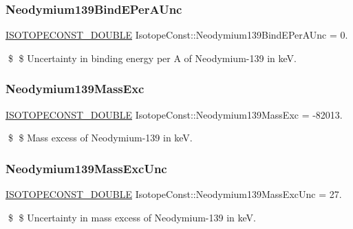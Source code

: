\subsubsection{\texorpdfstring{Neodymium139\+Bind\+E\+Per\+A\+Unc}{Neodymium139BindEPerAUnc}}
{\footnotesize\ttfamily \mbox{\hyperlink{group___isotope_const-_macros_ga8f45a7272ce02c0b4c65c44636ed719a}{I\+S\+O\+T\+O\+P\+E\+C\+O\+N\+S\+T\+\_\+\+D\+O\+U\+B\+LE}} Isotope\+Const\+::\+Neodymium139\+Bind\+E\+Per\+A\+Unc = 0.}

\$ \$ Uncertainty in binding energy per A of Neodymium-\/139 in keV. \mbox{\label{group___isotope_const-_neodymium-_nd139_gac33d0d9065e27fe2f9649759d564e57c}} 
\subsubsection{\texorpdfstring{Neodymium139\+Mass\+Exc}{Neodymium139MassExc}}
{\footnotesize\ttfamily \mbox{\hyperlink{group___isotope_const-_macros_ga8f45a7272ce02c0b4c65c44636ed719a}{I\+S\+O\+T\+O\+P\+E\+C\+O\+N\+S\+T\+\_\+\+D\+O\+U\+B\+LE}} Isotope\+Const\+::\+Neodymium139\+Mass\+Exc = -\/82013.}

\$ \$ Mass excess of Neodymium-\/139 in keV. \mbox{\label{group___isotope_const-_neodymium-_nd139_ga522eef4a395741948985f707f1c43ab9}} 
\subsubsection{\texorpdfstring{Neodymium139\+Mass\+Exc\+Unc}{Neodymium139MassExcUnc}}
{\footnotesize\ttfamily \mbox{\hyperlink{group___isotope_const-_macros_ga8f45a7272ce02c0b4c65c44636ed719a}{I\+S\+O\+T\+O\+P\+E\+C\+O\+N\+S\+T\+\_\+\+D\+O\+U\+B\+LE}} Isotope\+Const\+::\+Neodymium139\+Mass\+Exc\+Unc = 27.}

\$ \$ Uncertainty in mass excess of Neodymium-\/139 in keV. \mbox{\label{group___isotope_const-_neodymium-_nd139_gafee0324e5ed61cc13980bccd3138e74f}} 
